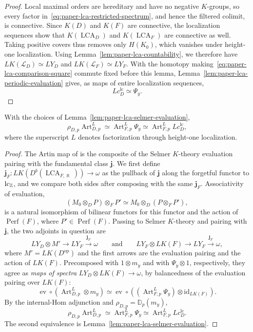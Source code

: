 \begin{proof}
Local maximal orders are hereditary and have no negative $K$-groups, so every factor in~\eqref{eq:paper-lca-restricted-spectrum}, and hence the filtered colimit, is connective.
Since $K(D)$ and $K(F)$ are connective, the localization sequences show that $K(\operatorname{LCA}_D)$ and $K(\operatorname{LCA}_F)$ are connective as well.
Taking positive covers thus removes only $H(K_0)$, which vanishes under height-one localization.
Using Lemma~\ref{lem:paper-lca-countability}, we therefore have $LK(\mathcal L_D)\simeq LY_D$ and $LK(\mathcal L_F)\simeq LY_F$.
With the homotopy making~\eqref{eq:paper-lca-comparison-square} commute fixed before this lemma, Lemma~\ref{lem:paper-lca-periodic-evaluation} gives, as maps of entire localization sequences,
\[
                         Lc^{\mathrm{lc}}_D\simeq \Psi_y.
\]
\end{proof}

\begin{lemma}\label{lem:paper-lca-artin-compatibility}
With the choices of Lemma~\ref{lem:paper-lca-selmer-evaluation},
\[
 \rho_{D,p}\operatorname{Art}_{D,p}^{L}
 \simeq\operatorname{Art}_{F,p}^{L}\Psi_y
 \simeq\operatorname{Art}_{F,p}^{L}Lc^{\mathrm{lc}}_D,
\]
where the superscript $L$ denotes factorization through height-one localization.
\end{lemma}
\begin{proof}
The Artin map of \cite[Definition 4.2]{ClausenArtin} is the composite of the Selmer $K$-theory evaluation pairing with the fundamental class $\mathbf j$.
We first define $\mathbf j_F\colon LK(D^b(\operatorname{LCA}_{F,\aleph}))\to\omega$ as the pullback of $\mathbf j$ along the forgetful functor to $\mathrm{lc}_\mathbb Z$, and we compare both sides after composing with the same $\mathbf j_F$.
Associativity of evaluation,
\[
 (M_0\otimes_D P)\otimes_F P'
 \simeq M_0\otimes_D(P\otimes_F P'),
\]
is a natural isomorphism of bilinear functors for this functor and the action of $\operatorname{Perf}(F)$, where $P'\in\operatorname{Perf}(F)$.
Passing to Selmer $K$-theory and pairing with $\mathbf j$, the two adjoints in question are
\[
 LY_D\otimes M'\longrightarrow LY_F\xrightarrow{\mathbf j_F}\omega
 \qquad\text{and}\qquad
 LY_F\otimes LK(F)\longrightarrow LY_F\xrightarrow{\mathbf j_F}\omega,
\]
where $M'=LK(D^{\mathrm{op}})$ and the first arrows are the evaluation pairing and the action of $LK(F)$.
Precomposed with $1\otimes m_y$ and with $\Psi_y\otimes1$, respectively, they agree as \emph{maps of spectra} $LY_D\otimes LK(F)\to\omega$, by balancedness of the evaluation pairing over $LK(F)$:
\[
 \operatorname{ev}\circ
   (\operatorname{Art}_{D,p}^{L}\otimes m_y)
 \simeq
 \operatorname{ev}\circ
   ((\operatorname{Art}_{F,p}^{L}\Psi_y)\otimes\mathrm{id}_{LK(F)}).
\]
By the internal-Hom adjunction and $\rho_{D,p}=\mathbb{D}_p(m_y)$,
\[
 \rho_{D,p}\operatorname{Art}_{D,p}^{L}
 \simeq\operatorname{Art}_{F,p}^{L}\Psi_y
 \simeq\operatorname{Art}_{F,p}^{L}Lc^{\mathrm{lc}}_D.
\]
The second equivalence is Lemma~\ref{lem:paper-lca-selmer-evaluation}.
\end{proof}

